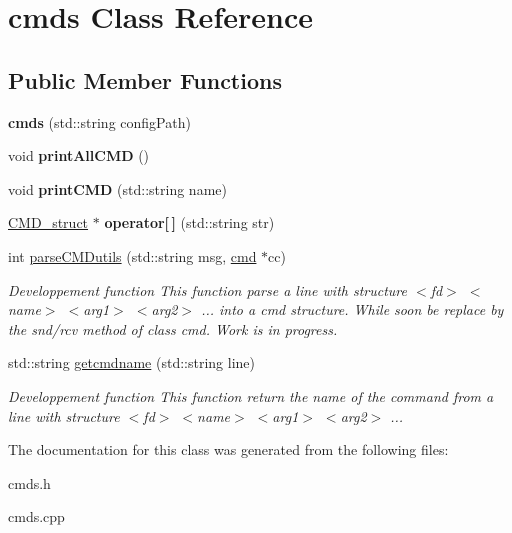 \hypertarget{classcmds}{}\section{cmds Class Reference}
\label{classcmds}
\subsection*{Public Member Functions}
\begin{DoxyCompactItemize}
\item 
{\bfseries cmds} (std\+::string config\+Path)\hypertarget{classcmds_aeec7cef2da273f633cd5101732977ca1}{}\label{classcmds_aeec7cef2da273f633cd5101732977ca1}

\item 
void {\bfseries print\+All\+C\+MD} ()\hypertarget{classcmds_a5adcb2a9897009b23381d1d5aa25f0e9}{}\label{classcmds_a5adcb2a9897009b23381d1d5aa25f0e9}

\item 
void {\bfseries print\+C\+MD} (std\+::string name)\hypertarget{classcmds_a7a8e9320dda5498f16b5e974d7a9c5fa}{}\label{classcmds_a7a8e9320dda5498f16b5e974d7a9c5fa}

\item 
\hyperlink{structCMD__struct}{C\+M\+D\+\_\+struct} $\ast$ {\bfseries operator\mbox{[}$\,$\mbox{]}} (std\+::string str)\hypertarget{classcmds_af06d9bc7a5e430eee469bf8cfeaa2a0f}{}\label{classcmds_af06d9bc7a5e430eee469bf8cfeaa2a0f}

\item 
int \hyperlink{classcmds_abfa99118af46ec0132d0cf752688293a}{parse\+C\+M\+Dutils} (std\+::string msg, \hyperlink{structCMD__struct}{cmd} $\ast$cc)\hypertarget{classcmds_abfa99118af46ec0132d0cf752688293a}{}\label{classcmds_abfa99118af46ec0132d0cf752688293a}

\begin{DoxyCompactList}\small\item\em Developpement function This function parse a line with structure $<$fd$>$ $<$name$>$ $<$arg1$>$ $<$arg2$>$ ... into a cmd structure. While soon be replace by the snd/rcv method of class cmd. Work is in progress. \end{DoxyCompactList}\item 
std\+::string \hyperlink{classcmds_a68fb7f003bec99e4aeea198219b7acc5}{getcmdname} (std\+::string line)\hypertarget{classcmds_a68fb7f003bec99e4aeea198219b7acc5}{}\label{classcmds_a68fb7f003bec99e4aeea198219b7acc5}

\begin{DoxyCompactList}\small\item\em Developpement function This function return the name of the command from a line with structure $<$fd$>$ $<$name$>$ $<$arg1$>$ $<$arg2$>$ ... \end{DoxyCompactList}\end{DoxyCompactItemize}


The documentation for this class was generated from the following files\+:\begin{DoxyCompactItemize}
\item 
cmds.\+h\item 
cmds.\+cpp\end{DoxyCompactItemize}
